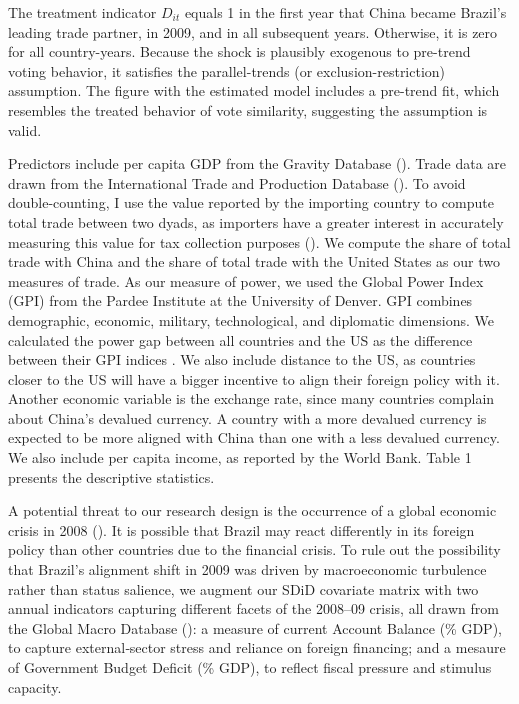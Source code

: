 \documentclass[
  12pt,
]{article}
\begin{document}
The treatment indicator \(D_{it}\) equals 1 in the first year that China
became Brazil's leading trade partner, in 2009, and in all subsequent
years. Otherwise, it is zero for all country-years. Because the shock is
plausibly exogenous to pre-trend voting behavior, it satisfies the
parallel-trends (or exclusion-restriction) assumption. The figure with
the estimated model includes a pre-trend fit, which resembles the
treated behavior of vote similarity, suggesting the assumption is valid.

Predictors include per capita GDP from the Gravity Database
(). Trade
data are drawn from the International Trade and Production Database
(). To avoid
double-counting, I use the value reported by the importing country to
compute total trade between two dyads, as importers have a greater
interest in accurately measuring this value for tax collection purposes
(). We compute the
share of total trade with China and the share of total trade with the
United States as our two measures of trade. As our measure of power, we
used the Global Power Index (GPI) from the Pardee Institute at the
University of Denver. GPI combines demographic, economic, military,
technological, and diplomatic dimensions. We calculated the power gap
between all countries and the US as the difference between their GPI
indices . We also include distance to the US, as countries closer to the
US will have a bigger incentive to align their foreign policy with it.
Another economic variable is the exchange rate, since many countries
complain about China's devalued currency. A country with a more devalued
currency is expected to be more aligned with China than one with a less
devalued currency. We also include per capita income, as reported by the
World Bank. Table 1 presents the descriptive statistics.

A potential threat to our research design is the occurrence of a global
economic crisis in 2008 (). It is possible that Brazil may react differently
in its foreign policy than other countries due to the financial crisis.
To rule out the possibility that Brazil's alignment shift in 2009 was
driven by macroeconomic turbulence rather than status salience, we
augment our SDiD covariate matrix with two annual indicators capturing
different facets of the 2008--09 crisis, all drawn from the Global Macro
Database (): a measure
of current Account Balance (\% GDP), to capture external‐sector stress
and reliance on foreign financing; and a mesaure of Government Budget
Deficit (\% GDP), to reflect fiscal pressure and stimulus capacity.
\end{document}
